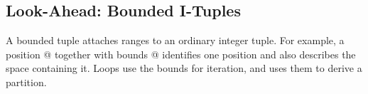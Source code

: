 \subsection*{Look-Ahead: Bounded I-Tuples}

A bounded tuple attaches ranges to an ordinary integer tuple. For example, a position @ together with bounds \co@[4, 8]@ identifies one position and also describes the space containing it. Loops use the bounds for iteration, and \co@chunkat@ uses them to derive a partition.
